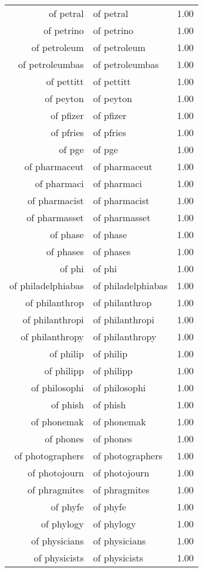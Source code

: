 \begin{table}[ht]
\begin{tabular}{rlr}
  of petral & of petral & 1.00 \\ 
  of petrino & of petrino & 1.00 \\ 
  of petroleum & of petroleum & 1.00 \\ 
  of petroleumbas & of petroleumbas & 1.00 \\ 
  of pettitt & of pettitt & 1.00 \\ 
  of peyton & of peyton & 1.00 \\ 
  of pfizer & of pfizer & 1.00 \\ 
  of pfries & of pfries & 1.00 \\ 
  of pge & of pge & 1.00 \\ 
  of pharmaceut & of pharmaceut & 1.00 \\ 
  of pharmaci & of pharmaci & 1.00 \\ 
  of pharmacist & of pharmacist & 1.00 \\ 
  of pharmasset & of pharmasset & 1.00 \\ 
  of phase & of phase & 1.00 \\ 
  of phases & of phases & 1.00 \\ 
  of phi & of phi & 1.00 \\ 
  of philadelphiabas & of philadelphiabas & 1.00 \\ 
  of philanthrop & of philanthrop & 1.00 \\ 
  of philanthropi & of philanthropi & 1.00 \\ 
  of philanthropy & of philanthropy & 1.00 \\ 
  of philip & of philip & 1.00 \\ 
  of philipp & of philipp & 1.00 \\ 
  of philosophi & of philosophi & 1.00 \\ 
  of phish & of phish & 1.00 \\ 
  of phonemak & of phonemak & 1.00 \\ 
  of phones & of phones & 1.00 \\ 
  of photographers & of photographers & 1.00 \\ 
  of photojourn & of photojourn & 1.00 \\ 
  of phragmites & of phragmites & 1.00 \\ 
  of phyfe & of phyfe & 1.00 \\ 
  of phylogy & of phylogy & 1.00 \\ 
  of physicians & of physicians & 1.00 \\ 
  of physicists & of physicists & 1.00 \\ 

\end{tabular}
\end{table}
